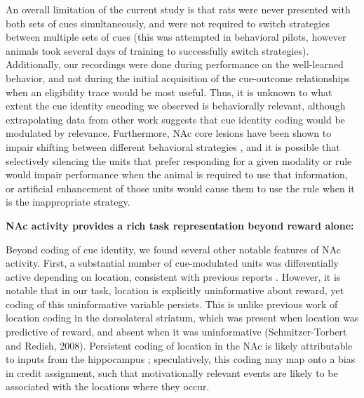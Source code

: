 \documentclass[11pt]{article}
\let\cite=\citep
\providecommand{\DIFadd}[1]{{\protect\color{red} \sf #1}} %
\providecommand{\DIFdel}[1]{} %
\providecommand{\DIFaddbegin}{} %
\providecommand{\DIFaddend}{} %
\providecommand{\DIFdelbegin}{} %
\providecommand{\DIFdelend}{} %
\newcommand{\DIFscaledelfig}{0.5}
\newlength{\DIFdelgraphicswidth} %
\newlength{\DIFdelgraphicsheight} %
\newcommand{\DIFaddincludegraphics}[2][]{{\color{red}\fbox{\DIFOincludegraphics[#1]{#2}}}} %
\newcommand{\DIFdelincludegraphics}[2][]{%
\sbox{\DIFdelgraphicsbox}{\DIFOincludegraphics[#1]{#2}}%
\settoboxwidth{\DIFdelgraphicswidth}{\DIFdelgraphicsbox} %
\settoboxtotalheight{\DIFdelgraphicsheight}{\DIFdelgraphicsbox} %
\scalebox{\DIFscaledelfig}{%
\parbox[b]{\DIFdelgraphicswidth}{\usebox{\DIFdelgraphicsbox}\\[-\baselineskip] \rule{\DIFdelgraphicswidth}{0em}}\llap{\resizebox{\DIFdelgraphicswidth}{\DIFdelgraphicsheight}{%
\setlength{\unitlength}{\DIFdelgraphicswidth}%
\begin{picture}(1,1)%
\thicklines\linethickness{2pt} %
{\color[rgb]{1,0,0}\put(0,0){\framebox(1,1){}}}%
{\color[rgb]{1,0,0}\put(0,0){\line( 1,1){1}}}%
{\color[rgb]{1,0,0}\put(0,1){\line(1,-1){1}}}%
\end{picture}%
}\hspace*{3pt}}} %
} %
\DeclareRobustCommand{\DIFaddbegin}{\DIFOaddbegin \let\includegraphics\DIFaddincludegraphics} %
\DeclareRobustCommand{\DIFaddend}{\DIFOaddend \let\includegraphics\DIFOincludegraphics} %
\DeclareRobustCommand{\DIFdelbegin}{\DIFOdelbegin \let\includegraphics\DIFdelincludegraphics} %
\DeclareRobustCommand{\DIFdelend}{\DIFOaddend \let\includegraphics\DIFOincludegraphics} %
\begin{document}
\DIFdelend An overall limitation of the current study is that rats were never
presented with both sets of cues simultaneously, and were not required
to switch strategies between multiple sets of cues \DIFdelbegin \DIFdel{. }\DIFdelend \DIFaddbegin \DIFadd{(this was attempted
in behavioral pilots, however animals took several days of training to
successfully switch strategies). Additionally, our recordings were
done during performance on the well-learned behavior, and not during
the initial acquisition of the cue-outcome relationships when an
eligibility trace would be most useful. }\DIFaddend Thus, it is unknown to what
extent the cue identity encoding we observed is behaviorally relevant,
although extrapolating data from other work \cite{Sleezer2016}
suggests that cue identity coding would be modulated by
relevance. \DIFaddbegin \DIFadd{Furthermore, }\DIFaddend NAc core lesions have been shown to impair
shifting between different behavioral strategies \cite{Floresco2006a},
and it is possible that selectively silencing the units that prefer
responding for a given modality or rule would impair performance when
the animal is required to use that information, or artificial
enhancement of those units would cause them to use the rule when it is
the inappropriate strategy.

{\bf \DIFdelbegin \DIFdel{Encoding of position}\DIFdelend \DIFaddbegin \DIFadd{NAc activity provides a rich task representation beyond reward alone}\DIFaddend :}

\DIFdelbegin \DIFdel{Our finding that cue-evoked activitywas modulated by cue locationis
in alignment with
several }\DIFdelend \DIFaddbegin \DIFadd{Beyond coding of cue identity, we found several other notable features
of NAc activity. First, a substantial number of cue-modulated units
was differentially active depending on location, consistent with
}\DIFaddend previous reports
\cite{Lavoie1994,Wiener2003,Mulder2005,Strait2016}. \DIFdelbegin \DIFdel{The NAc receives
}\DIFdelend \DIFaddbegin \DIFadd{However, it is
notable that in our task, location is explicitly uninformative about
reward, yet coding of this uninformative variable persists. This is
unlike previous work of location coding in the dorsolateral striatum,
which was present when location was predictive of reward, and absent
when it was uninformative (Schmitzer-Torbert and Redish,
2008). Persistent coding of location in the NAc is likely attributable
to }\DIFaddend inputs from the hippocampus
\DIFdelbegin \DIFdel{, and the communication of place-reward
information across the two structures suggests that the NAc tracks
locations associated with reward
\cite{Tabuchi2000,Pennartz2004,Lansink2008,Lansink2009,VanderMeer2011,Lansink2016,Sjulson2017}. }\DIFdelend \DIFaddbegin \DIFadd{\cite{Tabuchi2000,VanderMeer2011,Lansink2016,Sjulson2017};
speculatively, this coding may map onto a bias in credit assignment,
such that motivationally relevant events are likely to be associated
with the locations where they occur.
}
\end{document}
